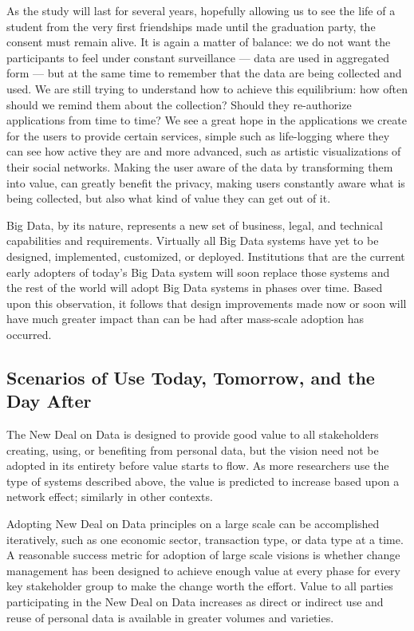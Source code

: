 As the study will last for several years, hopefully allowing us to see the life of a student from the very first friendships made until the graduation party, the consent must remain alive.
It is again a matter of balance: we do not want the participants to feel under constant surveillance --- data are used in aggregated form --- but at the same time to remember that the data are being collected and used.
We are still trying to understand how to achieve this equilibrium: how often should we remind them about the collection?
Should they re-authorize applications from time to time?
We see a great hope in the applications we create for the users to provide certain services, simple such as life-logging where they can see how active they are and more advanced, such as artistic visualizations of their social networks.
Making the user aware of the data by transforming them into value, can greatly benefit the privacy, making users constantly aware what is being collected, but also what kind of value they can get out of it.

Big Data, by its nature, represents a new set of business, legal, and technical capabilities and requirements.
Virtually all Big Data systems have yet to be designed, implemented, customized, or deployed.
Institutions that are the current early adopters of today’s Big Data system will soon replace those systems and the rest of the world will adopt Big Data systems in phases over time.
Based upon this observation, it follows that design improvements made now or soon will have much greater impact than can be had after mass-scale adoption has occurred.  

 \subsection{Scenarios of Use Today, Tomorrow, and the Day After}

The New Deal on Data is designed to provide good value to all stakeholders creating, using, or benefiting from personal data, 
but the vision need not be adopted in its entirety before value starts to flow.
As more researchers use the type of systems described above, 
the value is predicted to increase based upon a network effect; similarly in other contexts.

Adopting New Deal on Data principles on a large scale can be accomplished iteratively, 
such as one economic sector, transaction type, or data type at a time.
A reasonable success metric for adoption of large scale visions is whether change management 
has been designed to achieve enough value at every phase for every key stakeholder group to make the change worth the effort.
Value to all parties participating in the New Deal on Data increases as 
direct or indirect use and reuse of personal data is available in greater volumes and varieties.

